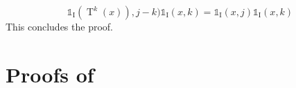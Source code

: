 \documentclass{article}
\def\transfo{\operatorname{T}}
\newcommand{\1}{\mathds{1}}
\newcommand{\indi}[1]{\1_{#1}}
\def\rmi{\mathrm{I}}
\begin{document}
\begin{equation*}
    \1_{\rmi}(\transfo^k(x)),j-k)\indi{\rmi}(x,k) %
=\indi{\rmi}(x,j)\indi{\rmi}(x,k) 
\end{equation*}
This concludes the proof.

\section{Proofs of }
\label{sec:supp:proof_mcmc}
\end{document}
